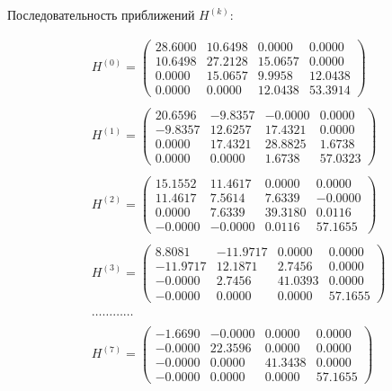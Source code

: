 \documentclass[12pt, a4paper]{article}
\begin{document}
	Последовательность приближений $H^{(k)}$:
	
	\begin{eqnarray*}
		&  H^{(0)} = \begin{pmatrix}
			28.6000	& 10.6498	& 0.0000	& 0.0000 \\
			10.6498	& 27.2128	& 15.0657 &	0.0000	\\
			0.0000	& 15.0657	& 9.9958	& 12.0438 \\
			0.0000	& 0.0000	& 12.0438	& 53.3914
		\end{pmatrix} \\\\
		& H^{(1)} = \begin{pmatrix}
			20.6596	& -9.8357	& -0.0000	& 0.0000\\
			-9.8357	& 12.6257	& 17.4321	& 0.0000\\
			0.0000	& 17.4321	& 28.8825	& 1.6738\\
			0.0000	& 0.0000	& 1.6738	& 57.0323	
		\end{pmatrix} \\\\
		& H^{(2)} = \begin{pmatrix}
			15.1552	& 11.4617	& 0.0000	& 0.0000\\
			11.4617	& 7.5614	& 7.6339	& -0.0000\\
			0.0000	& 7.6339	& 39.3180	& 0.0116\\
			-0.0000	& -0.0000	& 0.0116	& 57.1655	
		\end{pmatrix} \\\\
		& H^{(3)} = \begin{pmatrix}
			8.8081	& -11.9717	& 0.0000	& 0.0000\\
			-11.9717	& 12.1871	& 2.7456	& 0.0000\\
			-0.0000	& 2.7456	& 41.0393	& 0.0000\\
			-0.0000	& 0.0000	& 0.0000	& 57.1655
		\end{pmatrix} \\\\
		& \ldots\ldots\ldots\ldots \\\\
		& H^{(7)} = \begin{pmatrix}
			-1.6690	& -0.0000	& 0.0000	& 0.0000\\
			-0.0000	& 22.3596	& 0.0000	& 0.0000\\
			-0.0000	& 0.0000	& 41.3438	& 0.0000\\
			-0.0000	& 0.0000	& 0.0000	& 57.1655
		\end{pmatrix}
	\end{eqnarray*}
	
\end{document}
